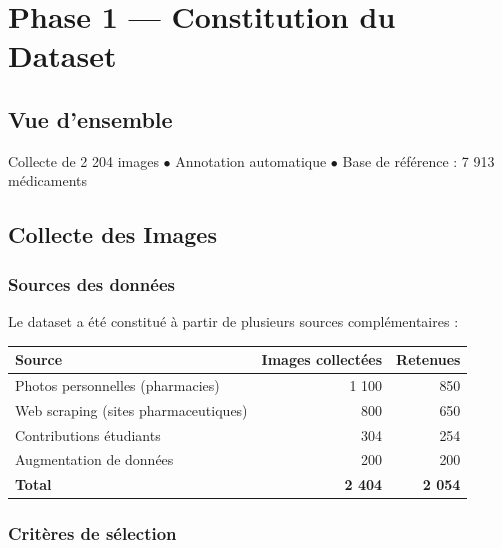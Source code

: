 \documentclass[12pt,a4paper]{report}
\begin{document}
\chapter{Phase 1 --- Constitution du Dataset}

\section{Vue d'ensemble}

\begin{successbox}
Collecte de 2 204 images $\bullet$ Annotation automatique $\bullet$ Base de r\'ef\'erence : 7 913 m\'edicaments
\end{successbox}

\section{Collecte des Images}

\subsection{Sources des donn\'ees}

Le dataset a \'et\'e constitu\'e \`a partir de plusieurs sources compl\'ementaires :

\begin{center}
\begin{tabular}{lrr}
\toprule
\textbf{Source} & \textbf{Images collect\'ees} & \textbf{Retenues} \\
\midrule
Photos personnelles (pharmacies) & 1 100 & 850 \\
Web scraping (sites pharmaceutiques) & 800 & 650 \\
Contributions \'etudiants & 304 & 254 \\
Augmentation de donn\'ees & 200 & 200 \\
\midrule
\textbf{Total} & \textbf{2 404} & \textbf{2 054} \\
\bottomrule
\end{tabular}
\end{center}

\subsection{Crit\`eres de s\'election}
\end{document}
